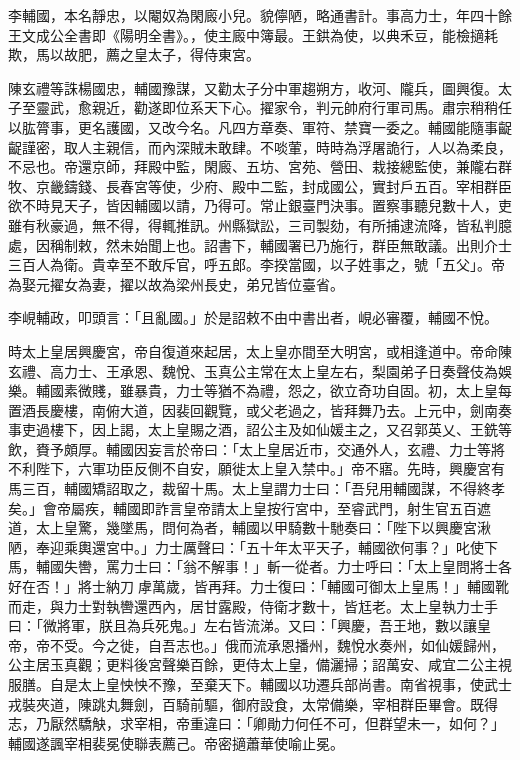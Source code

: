 
\begin{pinyinscope}

 李輔國，本名靜忠，以閹奴為閑廄小兒。貌儜陋，略通書計。事高力士，年四十餘王文成公全書即《陽明全書》。，使主廄中簿最。王鉷為使，以典禾豆，能檢擿耗欺，馬以故肥，薦之皇太子，得侍東宮。



 陳玄禮等誅楊國忠，輔國豫謀，又勸太子分中軍趨朔方，收河、隴兵，圖興復。太子至靈武，愈親近，勸遂即位系天下心。擢家令，判元帥府行軍司馬。肅宗稍稍任以肱膂事，更名護國，又改今名。凡四方章奏、軍符、禁寶一委之。輔國能隨事齪齪謹密，取人主親信，而內深賊未敢肆。不啖葷，時時為浮屠詭行，人以為柔良，不忌也。帝還京師，拜殿中監，閑廄、五坊、宮苑、營田、栽接總監使，兼隴右群牧、京畿鑄錢、長春宮等使，少府、殿中二監，封成國公，實封戶五百。宰相群臣欲不時見天子，皆因輔國以請，乃得可。常止銀臺門決事。置察事聽兒數十人，吏雖有秋豪過，無不得，得輒推訊。州縣獄訟，三司製劾，有所捕逮流降，皆私判臆處，因稱制敕，然未始聞上也。詔書下，輔國署已乃施行，群臣無敢議。出則介士三百人為衛。貴幸至不敢斥官，呼五郎。李揆當國，以子姓事之，號「五父」。帝為娶元擢女為妻，擢以故為梁州長史，弟兄皆位臺省。



 李峴輔政，叩頭言：「且亂國。」於是詔敕不由中書出者，峴必審覆，輔國不悅。



 時太上皇居興慶宮，帝自復道來起居，太上皇亦間至大明宮，或相逢道中。帝命陳玄禮、高力士、王承恩、魏悅、玉真公主常在太上皇左右，梨園弟子日奏聲伎為娛樂。輔國素微賤，雖暴貴，力士等猶不為禮，怨之，欲立奇功自固。初，太上皇每置酒長慶樓，南俯大道，因裴回觀覽，或父老過之，皆拜舞乃去。上元中，劍南奏事吏過樓下，因上謁，太上皇賜之酒，詔公主及如仙媛主之，又召郭英乂、王銑等飲，賚予頗厚。輔國因妄言於帝曰：「太上皇居近市，交通外人，玄禮、力士等將不利陛下，六軍功臣反側不自安，願徙太上皇入禁中。」帝不寤。先時，興慶宮有馬三百，輔國矯詔取之，裁留十馬。太上皇謂力士曰：「吾兒用輔國謀，不得終孝矣。」會帝屬疾，輔國即詐言皇帝請太上皇按行宮中，至睿武門，射生官五百遮道，太上皇驚，幾墜馬，問何為者，輔國以甲騎數十馳奏曰：「陛下以興慶宮湫陋，奉迎乘輿還宮中。」力士厲聲曰：「五十年太平天子，輔國欲何事？」叱使下馬，輔國失轡，罵力士曰：「翁不解事！」斬一從者。力士呼曰：「太上皇問將士各好在否！」將士納刀虖萬歲，皆再拜。力士復曰：「輔國可御太上皇馬！」輔國靴而走，與力士對執轡還西內，居甘露殿，侍衛才數十，皆尪老。太上皇執力士手曰：「微將軍，朕且為兵死鬼。」左右皆流涕。又曰：「興慶，吾王地，數以讓皇帝，帝不受。今之徙，自吾志也。」俄而流承恩播州，魏悅水奏州，如仙媛歸州，公主居玉真觀；更料後宮聲樂百餘，更侍太上皇，備灑掃；詔萬安、咸宜二公主視服膳。自是太上皇怏怏不豫，至棄天下。輔國以功遷兵部尚書。南省視事，使武士戎裝夾道，陳跳丸舞劍，百騎前驅，御府設食，太常備樂，宰相群臣畢會。既得志，乃厭然驕觖，求宰相，帝重違曰：「卿勛力何任不可，但群望未一，如何？」輔國遂諷宰相裴冕使聯表薦己。帝密擿蕭華使喻止冕。




\end{pinyinscope}
